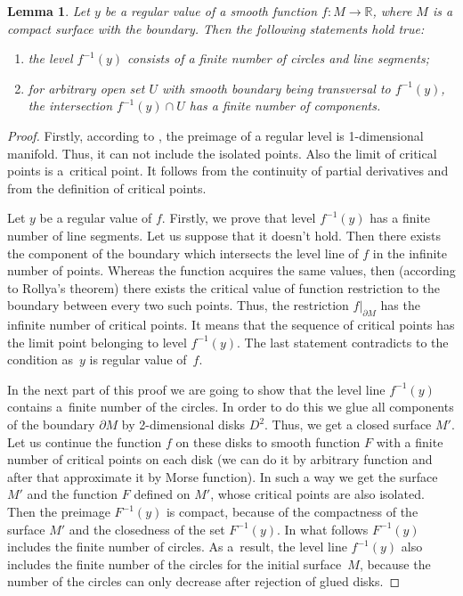 \documentclass[pdftex]{sigma}
\numberwithin{equation}{section}
\newtheorem{Lemma}[Theorem]{Lemma}
 { \theoremstyle{definition}
\newtheorem{Definition}[Theorem]{Definition}
}
\begin{document}
\begin{Lemma}\label{lemma2.1}
Let $y$ be a regular value of a smooth function $f\colon M\rightarrow\mathbb{R}$, where $M$ is a compact surface with the boundary. Then the following statements hold true:
\begin{enumerate}\itemsep=0pt
\item[$(i)$] the level $f^{-1}(y)$ consists of a finite number of circles and line segments;

\item[$(ii)$] for arbitrary open set $U$ with smooth boundary being transversal to $f^{-1}(y)$, the intersection $f^{-1}(y)\cap U$ has a finite number of components.
\end{enumerate}
\end{Lemma}

\begin{proof} Firstly, according to \cite[Lemma~1]{Milnor}, the preimage of a regular level is 1-dimensional manifold. Thus, it can not include the isolated points. Also the limit of critical points is a~critical point. It follows from the continuity of partial derivatives and from the def\/inition of critical points.

Let $y$ be a regular value of $f$. Firstly, we prove that level $f^{-1}(y)$ has a f\/inite number of line segments. Let us suppose that it doesn't hold. Then there exists the component of the boundary which intersects the level line of $f$ in the inf\/inite number of points. Whereas the function acquires the same values, then (according to Rollya's theorem) there exists the critical value of function restriction to the boundary between every two such points. Thus, the restriction $f|_{\partial M}$ has the inf\/inite number of critical points. It means that the sequence of critical points has the limit point belonging to level $f^{-1}(y)$. The last statement contradicts to the condition as~$y$ is regular value of~$f$.

In the next part of this proof we are going to show that the level line $f^{-1}(y)$ contains a~f\/inite number of the circles. In order to do this we glue all components of the boundary $\partial M$ by 2-di\-men\-sional disks $D^{2}$. Thus, we get a closed surface $M'$. Let us continue the function $f$ on these disks to smooth function $F$ with a f\/inite number of critical points on each disk (we can do it by arbitrary function and after that approximate it by Morse function). In such a way we get the surface $M'$ and the function $F$ def\/ined on $M'$, whose critical points are also isolated. Then the preimage $F^{-1}(y)$ is compact, because of the compactness of the surface $M'$ and the closedness of the set $F^{-1}(y)$. In what follows $F^{-1}(y)$ includes the f\/inite number of circles. As a~result, the level line $f^{-1}(y)$ also includes the f\/inite number of the circles for the initial surface~$M$, because the number of the circles can only decrease after rejection of glued disks.
\end{proof}
\end{document}
